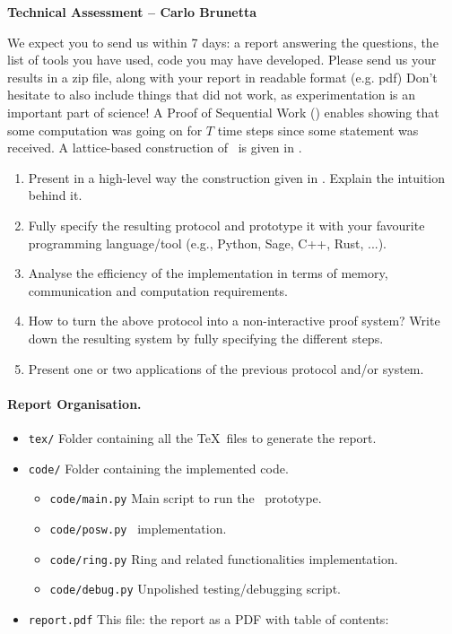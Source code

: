 \documentclass[a4paper,10pt]{article}
\begin{document}
	\begin{center}
		\textbf{\large Technical Assessment -- Carlo Brunetta}
		\vspace{2mm}
	\end{center}

	We expect you to send us within 7 days: a report answering the questions,
	the list of tools you have used, code you may have developed.
	Please send us your results in a zip file, along with your report in readable format (e.g. pdf)
	Don't hesitate to also include things that did not work, as experimentation is an important
	part of science!
	A Proof of Sequential Work (\PoSW) enables showing that some computation was going on for $T$ time
	steps since some statement was received.
	A lattice-based construction of \PoSW\ is given in \cite{EPRINT:LaiMal24}.

	\begin{enumerate}
		\item Present in a high-level way the construction given in \cite{EPRINT:LaiMal24}.
			Explain the intuition behind it.
		\item Fully specify the resulting protocol and prototype it with your favourite programming
			language/tool (e.g., Python, Sage, C++, Rust, ...).
		\item Analyse the efficiency of the implementation in terms of memory, communication and
			computation requirements.
		\item How to turn the above protocol into a non-interactive proof system? Write down the resulting
			system by fully specifying the different steps.
		\item Present one or two applications of the previous protocol and/or system.
	\end{enumerate}

	\vspace*{-10pt}
	\vfill
	
	\paragraph{Report Organisation.}
	\begin{itemize}
		\item \texttt{tex/} Folder containing all the \TeX\ files to generate the report.
		\item \texttt{code/} Folder containing the implemented code.
		\begin{itemize}
			\item \texttt{code/main.py} Main script to run the \PoSW\ prototype.
			\item \texttt{code/posw.py} \PoSW\ implementation.
			\item \texttt{code/ring.py} Ring and related functionalities implementation.
			\item \texttt{code/debug.py} Unpolished testing/debugging script.
		\end{itemize}
		\item \texttt{report.pdf} This file: the report as a PDF with table of contents:
			\renewcommand\contentsname{\vspace*{-35pt}}
			\setcounter{tocdepth}{1}
			\tableofcontents
	\end{itemize}
\end{document}
